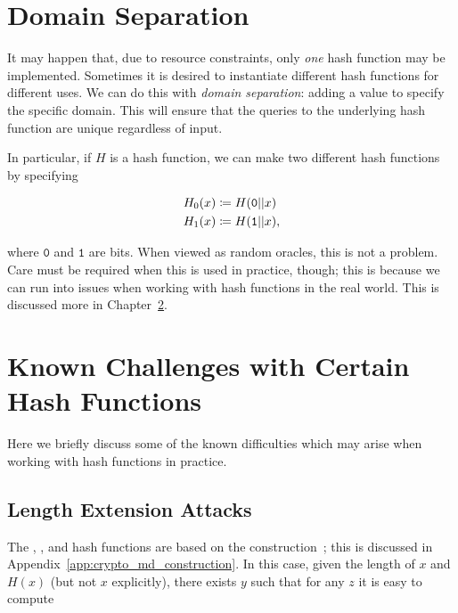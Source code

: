 \section{Domain Separation}

It may happen that, due to resource constraints, only \emph{one}
\gls{hash function} may be implemented.
Sometimes it is desired to instantiate different \glspl{hash function}
for different uses.
We can do this with \emph{domain separation}:
adding a value to specify the specific domain.
This will ensure that the queries to the underlying \gls{hash function}
are unique regardless of input.

In particular, if $H$ is a \gls{hash function}, we can make two different
\glspl{hash function} by specifying

\begin{align}
    H_{0}(x) &\coloneqq{} H(\texttt{0}||x) \nonumber\\
    H_{1}(x) &\coloneqq{} H(\texttt{1}||x),
\end{align}

\noindent
where $\texttt{0}$ and $\texttt{1}$ are bits.
When viewed as \glspl{random oracle}, this is not a problem.
Care must be required when this is used in practice, though;
this is because we can run into issues when working with
\glspl{hash function} in the real world.
This is discussed more in Chapter~\ref{sec:hash_challenges}.



\section{Known Challenges with Certain Hash Functions}
\label{sec:hash_challenges}

Here we briefly discuss some of the known difficulties which may arise when
working with \glspl{hash function} in practice.

\subsection{Length Extension Attacks}
\label{ssec:hash_challenges_length_extension}

The \MDFive{}, \ShaOne{}, and \ShaTwo{} \glspl{hash function} are based
on the \MD{}
construction~\cite{merkle1979secrecy,damgaard1989design};
this is discussed in Appendix~\ref{app:crypto_md_construction}.
In this case, given the length of $x$ and $H(x)$ (but not $x$ explicitly),
there exists $y$ such that for any $z$
it is easy to compute

